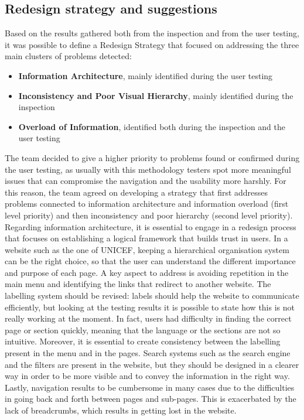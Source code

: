 
\subsection{Redesign strategy and suggestions}

Based on the results gathered both from the inspection and from the user testing, it was possible to define a Redesign Strategy that focused on addressing the three main clusters of problems detected:

\begin{itemize}
    \item \textbf{Information Architecture}, mainly identified during the user testing
    \item \textbf{Inconsistency and Poor Visual Hierarchy}, mainly identified during the inspection
    \item \textbf{Overload of Information}, identified both during the inspection and the user testing
\end{itemize}

The team decided to give a higher priority to problems found or confirmed during the user testing, as usually with this methodology testers spot more meaningful issues that can compromise the navigation and the usability more harshly. For this reason, the team agreed on developing a strategy that first addresses problems connected to information architecture and information overload (first level priority) and then inconsistency and poor hierarchy (second level priority).\\

Regarding information architecture, it is essential to engage in a redesign process that focuses on establishing a logical framework that builds trust in users. In a website such as the one of UNICEF, keeping a hierarchical organisation system can be the right choice, so that the user can understand the different importance and purpose of each page. A key aspect to address is avoiding repetition in the main menu and identifying the links that redirect to another website. The labelling system should be revised: labels should help the website to communicate efficiently, but looking at the testing results it is possible to state how this is not really working at the moment. In fact, users had difficulty in finding the correct page or section quickly, meaning that the language or the sections are not so intuitive. Moreover, it is essential to create consistency between the labelling present in the menu and in the pages. Search systems such as the search engine and the filters are present in the website, but they should be designed in a clearer way in order to be more visible and to convey the information in the right way. Lastly, navigation results to be cumbersome in many cases due to the difficulties in going back and forth between pages and sub-pages. This is exacerbated by the lack of breadcrumbs, which results in getting lost in the website.

